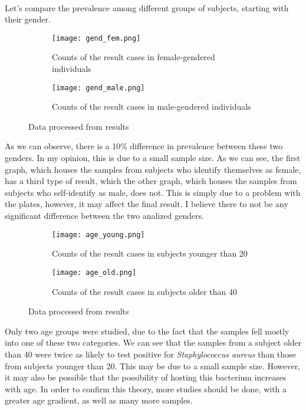 \paragraph{}Let's compare the prevalence among different groups of subjects, starting with their gender.
\begin{center}\begin{figure}[H]\centering\begin{subfigure}[b]{0.4\linewidth}\texttt{[image: gend\_fem.png]}\caption{Counts of the result cases in female-gendered individuals}\end{subfigure}\begin{subfigure}[b]{0.38\linewidth}\texttt{[image: gend\_male.png]}\caption{Counts of the result cases in male-gendered individuals}\end{subfigure}\caption{Data processed from results}\end{figure}\end{center}\vspace{-1.5em}
As we can observe, there is a 10\% difference in prevalence between these two genders. In my opinion, this is due to a small sample size. As we can see, the first graph, which houses the samples from subjects who identify themselves as female, has a third type of result, which the other graph, which houses the samples from subjects who self-identify as male, does not. This is simply due to a problem with the plates, however, it may affect the final result. I believe there to not be any significant difference between the two analized genders.
\begin{center}\begin{figure}[H]\centering\begin{subfigure}[b]{0.4\linewidth}\texttt{[image: age\_young.png]}\caption{Counts of the result cases in subjects younger than 20}\end{subfigure}\begin{subfigure}[b]{0.38\linewidth}\texttt{[image: age\_old.png]}\caption{Counts of the result cases in subjects older than 40}\end{subfigure}\caption{Data processed from results}\end{figure}\end{center}\vspace{-1.5em}
Only two age groups were studied, due to the fact that the samples fell mostly into one of these two categories. We can see that the samples from a subject older than 40 were twice as likely to test positive for \emph{Staphylococcus aureus} than those from subjects younger than 20. This may be due to a small sample size. However, it may also be possible that the possibility of hosting this bacterium increases with age. In order to confirm this theory, more studies should be done, with a greater age gradient, as well as many more samples.
